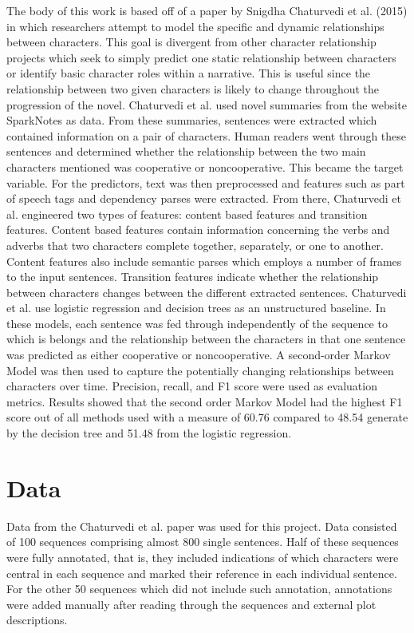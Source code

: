 \documentclass[11pt,a4paper]{article}
\begin{document}
The body of this work is based off of a paper by Snigdha Chaturvedi et al. (2015) in which researchers attempt to model the specific and dynamic relationships between characters. This goal is divergent from other character relationship projects which seek to simply predict one static relationship between characters or identify basic character roles within a narrative. This is useful since the relationship between two given characters is likely to change throughout the progression of the novel. Chaturvedi et al. used novel summaries from the website SparkNotes as data. From these summaries, sentences were extracted which contained information on a pair of characters. Human readers went through these sentences and determined whether the relationship between the two main characters mentioned was cooperative or noncooperative. This became the target variable. For the predictors, text was then preprocessed and features such as part of speech tags and dependency parses were extracted. From there, Chaturvedi et al. engineered two types of features: content based features and transition features. 
Content based features contain information concerning the verbs and adverbs that two characters complete together, separately, or one to another. Content features also include semantic parses which employs a number of frames to the input sentences. Transition features indicate whether the relationship between characters changes between the different extracted sentences. 
Chaturvedi et al. use logistic regression and decision trees as an unstructured baseline. In these models, each sentence was fed through independently of the sequence to which is belongs and the relationship between the characters in that one sentence was predicted as either cooperative or noncooperative. A second-order Markov Model was then used to capture the potentially changing relationships between characters over time. Precision, recall, and F1 score were used as evaluation metrics. Results showed that the second order Markov Model had the highest F1 score out of all methods used with a measure of 60.76 compared to 48.54 generate by the decision tree and 51.48 from the logistic regression. 

\section{Data}
Data from the Chaturvedi et al. paper was used for this project. Data consisted of 100 sequences comprising almost 800 single sentences. Half of these sequences were fully annotated, that is, they included indications of which characters were central in each sequence and marked their reference in each individual sentence. For the other 50 sequences which did not include such annotation, annotations were added manually after reading through the sequences and external plot descriptions.
\end{document}
